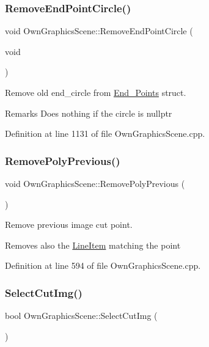 \subsubsection{\texorpdfstring{Remove\+End\+Point\+Circle()}{RemoveEndPointCircle()}}
{\footnotesize\ttfamily void Own\+Graphics\+Scene\+::\+Remove\+End\+Point\+Circle (\begin{DoxyParamCaption}\item[{void}]{ }\end{DoxyParamCaption})}



Remove old end\+\_\+circle from \mbox{\hyperlink{structEnd__Points}{End\+\_\+\+Points}} struct. 

\begin{DoxyRemark}{Remarks}
Does nothing if the circle is nullptr 
\end{DoxyRemark}


Definition at line 1131 of file Own\+Graphics\+Scene.\+cpp.

\mbox{\label{classOwnGraphicsScene_a4976a8e6f682612acd3e23b6c98bd8d8}} 
\subsubsection{\texorpdfstring{Remove\+Poly\+Previous()}{RemovePolyPrevious()}}
{\footnotesize\ttfamily void Own\+Graphics\+Scene\+::\+Remove\+Poly\+Previous (\begin{DoxyParamCaption}{ }\end{DoxyParamCaption})}



Remove previous image cut point. 

Removes also the \mbox{\hyperlink{classLineItem}{Line\+Item}} matching the point 

Definition at line 594 of file Own\+Graphics\+Scene.\+cpp.

\mbox{\label{classOwnGraphicsScene_ae79aa179ce90ab26f06d7d17eed96b93}} 
\subsubsection{\texorpdfstring{Select\+Cut\+Img()}{SelectCutImg()}}
{\footnotesize\ttfamily bool Own\+Graphics\+Scene\+::\+Select\+Cut\+Img (\begin{DoxyParamCaption}{ }\end{DoxyParamCaption})}



